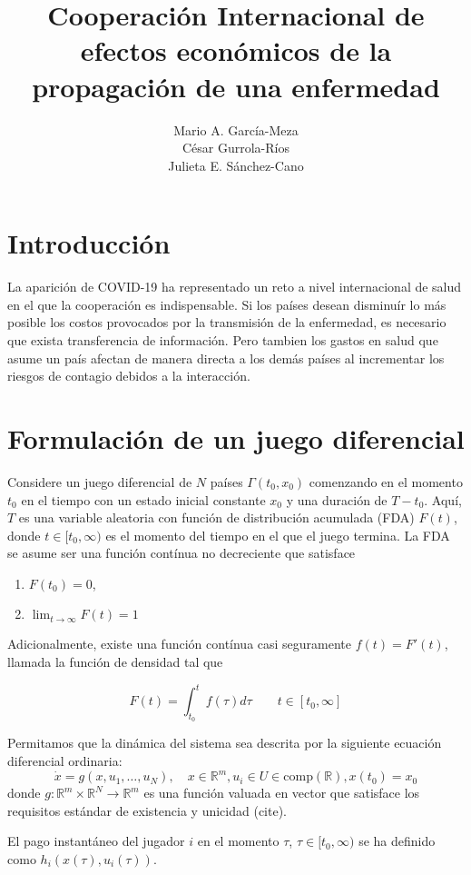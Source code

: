 \documentclass[11pt, oneside]{article}
\title{Cooperación Internacional de efectos económicos de la propagación de una enfermedad}
\author{Mario A. García-Meza\\ César Gurrola-Ríos \\ Julieta E. Sánchez-Cano}
\begin{document}
\maketitle


\section{Introducción}

La aparición de COVID-19 ha representado un reto a nivel internacional de salud en el que la cooperación es indispensable. Si los países desean disminuír lo más posible los costos provocados por la transmisión de la enfermedad, es necesario que exista transferencia de información. Pero tambien los gastos en salud que asume un país afectan de manera directa a los demás países al incrementar los riesgos de contagio debidos a la interacción.

\section{Formulación de un juego diferencial}

Considere un juego diferencial de $N$ países $\Gamma(t_0,x_0)$ comenzando en el momento $t_0$ en el tiempo con un estado inicial constante $x_0$ y una duración de $T-t_0$. Aquí, $T$ es una variable aleatoria con función de distribución acumulada (FDA) $F(t)$, donde $t\in[t_0,\infty)$ es el momento del tiempo en el que el juego termina. La FDA se asume ser una función contínua no decreciente que satisface

\begin{enumerate}
	\item $F(t_0) = 0$,
	\item $\lim_{t\to\infty}F(t)=1$
\end{enumerate}

Adicionalmente, existe una función contínua casi seguramente $f(t) = F'(t)$, llamada la función de densidad tal que

\begin{equation}
	F(t) = \int_{t_0}^t f(\tau)d\tau \qquad t \in [t_0,\infty]
\end{equation}

Permitamos que la dinámica del sistema sea descrita por la siguiente ecuación diferencial ordinaria:
\begin{equation}
	\dot{x} = g(x, u_1,\dots,u_N), \quad x\in\mathbb{R}^m, u_i \in U\in \mbox{comp}(\mathbb{R}), x(t_0) = x_0
\end{equation}
donde $g : \mathbb{R}^m\times \mathbb{R}^N \to \mathbb{R}^m$ es una función valuada en vector que satisface los requisitos estándar de existencia y unicidad (cite).

El pago instantáneo del jugador $i$ en el momento $\tau$, $\tau \in [t_0,\infty)$ se ha definido como $h_i(x(\tau), u_i(\tau))$.
\end{document}
